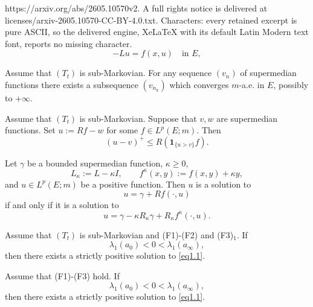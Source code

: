 \documentclass[10pt,a4paper]{amsart}
\begin{document}
https://arxiv.org/abs/2605.10570v2. A full rights notice is delivered at licenses/arxiv-2605.10570-CC-BY-4.0.txt. Characters: every retained excerpt is pure ASCII, so the delivered engine, XeLaTeX with its default Latin Modern text font, reports no missing character.
\begin{equation}\label{eq1.1}
    -Lu=f(x,u)\quad\text{in }E,
\end{equation}

\begin{theorem}
\label{lm.upseq}
Assume that $(T_t)$ is sub-Markovian. For any sequence $(v_n)$ of
supermedian functions there exists a subsequence $(v_{n_k})$ which
converges $m$-a.e. in $E$, possibly to $+\infty$.
\end{theorem}

\begin{proposition}
\label{lm2}
Assume that $(T_t)$ is sub-Markovian.   Suppose that  $v,w$ are  supermedian functions.
Set $u:=Rf-w$  for some $f\in L^p(E;m)$.
Then
\[
(u-v)^+\le R(\mathbf1_{\{u>v\}}f).
\]
\end{proposition}

\begin{proposition}
\label{prop.shifted-equation}
Let $\gamma$ be a bounded supermedian function,
$\kappa\geq 0$, 
\[
L_\kappa:=L-\kappa I,
\qquad
f^\kappa(x,y):=f(x,y)+\kappa y,
\]
and    $u\in L^p(E;m)$ be a positive function. Then  $u$ is a solution to
\begin{equation}
\label{eq.res123}
u=\gamma+Rf(\cdot,u)
\end{equation}
if and only if it is a solution to
\begin{equation}
\label{eq.res1234}
u=\gamma-\kappa R_\kappa\gamma+R_\kappa f^\kappa(\cdot,u).
\end{equation}
\end{proposition}

\begin{theorem}
\label{th.mainm}
Assume that $(T_t)$ is sub-Markovian and (F1)-(F2) and (F3)$_1$. If 
\[
\lambda_1(a_0)<0< \lambda_1(a_\infty),
\]
then there exists a strictly positive   solution to \eqref{eq1.1}.
\end{theorem}

\begin{theorem}
\label{th.main}
Assume that (F1)-(F3) hold. If 
\begin{equation}
\label{eq.nine}
\lambda_1(a_0)<0< \lambda_1(a_\infty),
\end{equation}
then there exists a  strictly positive solution to \eqref{eq1.1}.
\end{theorem}
\end{document}
